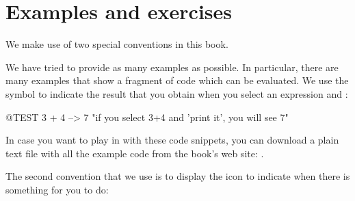 \documentclass[a4paper,10pt,twoside]{book}
\begin{document}




\section*{Examples and exercises}

We make use of two special conventions in this book.

We have tried to provide as many examples as possible.
In particular, there are many examples that show a fragment of code which can be evaluated.  We use the symbol \ct{-->} to indicate the result that you obtain when you select an expression and :

\begin{code}{@TEST}
3 + 4 --> 7    "if you select 3+4 and 'print it', you will see 7"
\end{code}

In case you want to play in \pharo with these code snippets, you can download a plain text file with all the example code from the book's web site: \pbe.

The second convention that we use is to display the icon \dothisicon{} to indicate when there is something for you to do:


\end{document}
